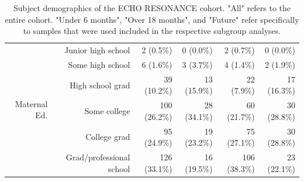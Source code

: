 \documentclass{article}
\begin{document}
\begin{table}[!h]
\begin{tabular}{|r|r|r|r|r|r|}
    \multirow{6}{*}{Maternal Ed.} & Junior high school       & 2 (0.5\%) & 0 (0.0\%) & 2 (0.7\%) & 0 (0.0\%) \\   \cline{2-6}
                                  & Some high school         & 6 (1.6\%) & 3 (3.7\%) & 4 (1.4\%) & 2 (1.9\%) \\ \cline{2-6}
                                  & High school grad         & 39 (10.2\%) & 13 (15.9\%) & 22 (7.9\%) & 17 (16.3\%) \\ \cline{2-6}
                                  & Some college             & 100 (26.2\%) & 28 (34.1\%) & 60 (21.7\%) & 30 (28.8\%) \\ \cline{2-6}
                                  & College grad             & 95 (24.9\%) & 19 (23.2\%) & 75 (27.1\%) & 30 (28.8\%) \\ \cline{2-6}
                                  & Grad/professional school & 126 (33.1\%) & 16 (19.5\%) & 106 (38.3\%) & 23 (22.1\%) \\ \hline\hline
    \end{tabular}
    \caption{\label{tab:demo}Subject demographics of the ECHO RESONANCE cohort.
            "All" refers to the entire cohort.
            "Under 6 months", "Over 18 months", and "Future" refer specifically
            to samples that were used included in the respective subgroup analyses.
    }
\end{table}
\end{document}
